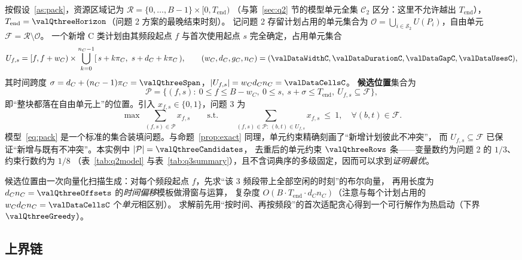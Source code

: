 按假设~\ref{as:pack}，资源区域记为 $\mathcal{R}=\{0,\dots,B-1\}\times[0,T_{\mathrm{end}})$
（与第~\ref{sec:q2} 节的模型单元全集 $\mathcal{C}_2$ 区分：这里不允许越出 $T_{\mathrm{end}}$），
$T_{\mathrm{end}}=\valQthreeHorizon$（问题 2 方案的最晚结束时刻）。
记问题 2 存留计划占用的单元集合为 $\mathcal{O}=\bigcup_{i\in\mathcal{S}_2}U(P_i)$，自由单元 $\mathcal{F}=\mathcal{R}\setminus\mathcal{O}$。
一个新增 C 类计划由其频段起点 $f$ 与首次使用起点 $s$ 完全确定，占用单元集合
\begin{equation}\label{eq:newcells}
  U_{f,s}=[f,f+w_C)\times\bigcup_{k=0}^{n_C-1}[\,s+k\pi_C,\ s+d_C+k\pi_C\,),\qquad
  (w_C,d_C,g_C,n_C)=(\valDataWidthC,\valDataDurationC,\valDataGapC,\valDataUsesC),
\end{equation}
其时间跨度 $\sigma=d_C+(n_C-1)\pi_C=\valQthreeSpan$，$|U_{f,s}|=w_Cd_Cn_C=\valDataCellsC$。
\textbf{候选位置}集合为
\begin{equation}\label{eq:candidates}
  \mathcal{P}=\bigl\{(f,s):\ 0\le f\le B-w_C,\ 0\le s,\ s+\sigma\le T_{\mathrm{end}},\ U_{f,s}\subseteq\mathcal{F}\bigr\},
\end{equation}
即“整块都落在自由单元上”的位置。引入 $x_{f,s}\in\{0,1\}$，问题 3 为
\begin{equation}\label{eq:pack}
  \max\ \sum_{(f,s)\in\mathcal{P}} x_{f,s}
  \qquad\text{s.t.}\qquad
  \sum_{(f,s)\in\mathcal{P}:\,(b,t)\in U_{f,s}} x_{f,s}\ \le\ 1,\quad \forall (b,t)\in\mathcal{F} .
\end{equation}
模型~\eqref{eq:pack} 是一个标准的集合装填问题\cite{padberg1973}。与命题~\ref{prop:exact} 同理，单元约束精确刻画了“新增计划彼此不冲突”，
而 $U_{f,s}\subseteq\mathcal{F}$ 已保证“新增与既有不冲突”。本实例中 $|\mathcal{P}|=\valQthreeCandidates$，
去重后的单元约束 $\valQthreeRows$ 条——变量数约为问题 2 的 $1/3$、约束行数约为 $1/8$
（表~\ref{tab:q2model} 与表~\ref{tab:q3summary}），且不含词典序的多级固定，因而可以求到\emph{证明最优}。

候选位置由一次向量化扫描生成：对每个频段起点 $f$，先求“该 $3$ 频段带上全部空闲的时刻”的布尔向量，
再用长度为 $d_Cn_C=\valQthreeOffsets$ 的\emph{时间偏移}模板做滑窗与运算，
复杂度 $O(B\cdot T_{\mathrm{end}}\cdot d_Cn_C)$（注意与每个计划占用的 $w_Cd_Cn_C=\valDataCellsC$ 个\emph{单元}相区别）。
求解前先用“按时间、再按频段”的首次适配贪心得到一个可行解作为热启动（下界 $\valQthreeGreedy$）。

\subsection{上界链}

